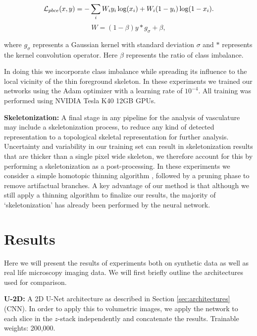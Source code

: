 \documentclass[journal,transmag]{IEEEtran}
\begin{document}
\begin{equation}
\mathcal{L}_{pbce}(x,y) = -\sum_i{W_i y_i \log(x_i) + W_i (1-y_i) \log(1-x_i)}. \\
\label{eq:wbce}
\end{equation}
\begin{equation}
W = (1-\beta) y \ast g_\sigma + \beta,
\end{equation}

where $g_\sigma$ represents a Gaussian kernel with standard deviation $\sigma$ and $\ast$ represents the kernel convolution operator. Here $\beta$ represents the ratio of class imbalance.

In doing this we incorporate class imbalance while spreading its influence to the local vicinity of the thin foreground skeleton. In these experiments we trained our networks using the Adam optimizer \cite{Kingma2014} with a learning rate of $10^{-4}$. All training was performed using NVIDIA Tesla K40 12GB GPUs.

\textbf{Skeletonization: } A final stage in any pipeline for the analysis of vasculature may include a skeletonization process, to reduce any kind of detected representation to a topological skeletal representation for further analysis. Uncertainty and variability in our training set can result in skeletonization results that are thicker than a single pixel wide skeleton, we therefore account for this by performing a skeletonization as a post-processing. In these experiments we consider a simple homotopic thinning algorithm \cite{Pudney1998}, followed by a pruning phase to remove artifactual branches. A key advantage of our method is that although we still apply a thinning algorithm to finalize our results, the majority of `skeletonization' has already been performed by the neural network.

\section{Results}

Here we will present the results of experiments both on synthetic data as well as real life microscopy imaging data. We will first briefly outline the architectures used for comparison.

\textbf{U-2D: } A 2D U-Net architecture as described in Section \ref{sec:architectures} (CNN). In order to apply this to volumetric images, we apply the network to each slice in the $z$-stack independently and concatenate the results. Trainable weights: 200,000.
\end{document}
